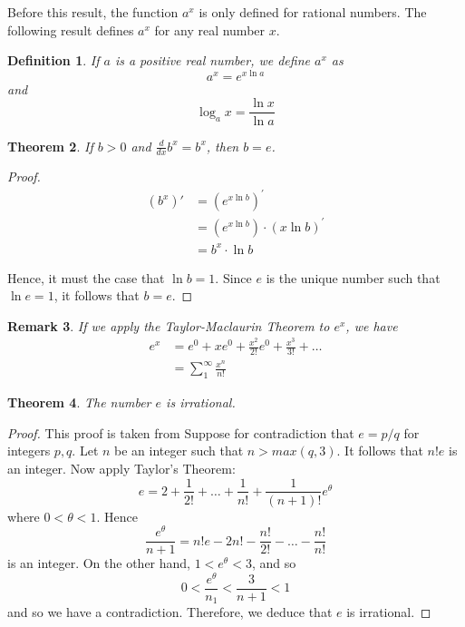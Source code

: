 \documentclass[12pt]{article}
\theoremstyle{mystyle}
\newtheorem{thm}{Theorem}
\newtheorem{defn}[thm]{Definition}
\newtheorem{remark}[thm]{Remark}
\begin{document}
Before this result, the function $a^x$ is only defined for rational numbers. The
following result defines $a^x$ for any real number $x$.
\begin{defn}
  If $a$ is a positive real number, we define $a^x$ as
  $$ a^x = e^{x \ln a} $$
  and
  $$ \log_a x = \frac{\ln x}{\ln a} $$
\end{defn}


\begin{thm}
  If $b > 0$ and $\frac{d}{dx} b^x = b^x$, then $b = e$.
\end{thm}
\begin{proof}
  \begin{align*}
    (b^x)' &= (e^{x \ln b})^\prime \\
           &= (e^{x \ln b}) \cdot (x \ln b)^\prime  \\
           &= b^x \cdot \ln b
  \end{align*}
  
  Hence, it must the case that $\ln b = 1$. Since $e$ is the unique number such
  that $\ln e = 1$, it follows that $b=e$.
\end{proof}


\begin{remark}
  If we apply the Taylor-Maclaurin Theorem to $e^x$, we have
  \begin{align*}
    e^x &= e^0 + xe^0 + \frac{x^2}{2!}e^0 + \frac{x^3}{3!} +  \ldots \\
        &= \sum_1^\infty \frac{x^n}{n!}
  \end{align*}
\end{remark}

\begin{thm}
  The number $e$ is irrational. 
\end{thm}
\begin{proof}
  This proof is taken from \cite[Example 6.10]{howie}
  Suppose for contradiction that $e = p/q$ for integers $p,q$. Let $n$ be an
  integer such that $n > max(q,3)$. It follows that $n!e$ is an integer. Now
  apply Taylor's Theorem:
  $$ e = 2 + \frac{1}{2!} + \ldots + \frac{1}{n!} + \frac{1}{(n+1)!}e^\theta $$
  where $0 < \theta < 1$. Hence
  $$ \frac{e^\theta}{n+1} = n!e - 2n! - \frac{n!}{2!} - \ldots - \frac{n!}{n!} $$
  is an integer. On the other hand, $1 < e^\theta < 3$, and so 
  $$ 0< \frac{e^\theta}{n_1} < \frac{3}{n+1} < 1 $$
  and so we have a contradiction. Therefore, we deduce that $e$ is irrational.
  
\end{proof}
\end{document}
